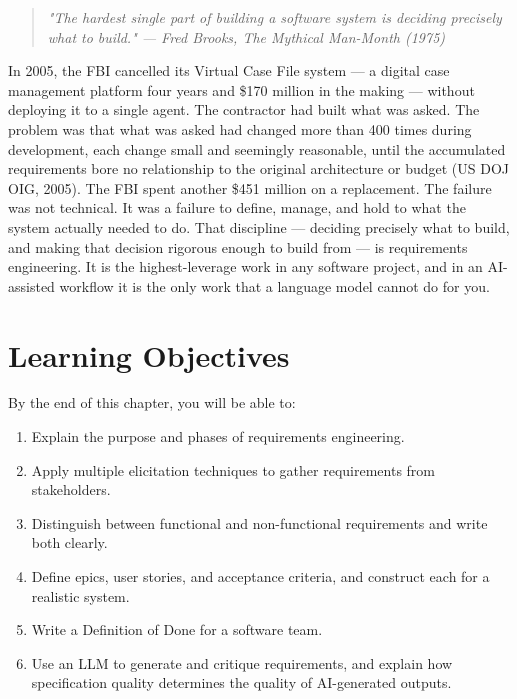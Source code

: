 \documentclass[11pt,a4paper]{book}
\begin{document}
\begin{quote}
\textit{\textit{"The hardest single part of building a software system is deciding precisely what to build."} --- Fred Brooks, \textit{The Mythical Man-Month} (1975)}
\end{quote}

\medskip

In 2005, the FBI cancelled its Virtual Case File system --- a digital case management platform four years and \$170 million in the making --- without deploying it to a single agent. The contractor had built what was asked. The problem was that what was asked had changed more than 400 times during development, each change small and seemingly reasonable, until the accumulated requirements bore no relationship to the original architecture or budget (US DOJ OIG, 2005). The FBI spent another \$451 million on a replacement. The failure was not technical. It was a failure to define, manage, and hold to what the system actually needed to do. That discipline --- deciding precisely what to build, and making that decision rigorous enough to build from --- is requirements engineering. It is the highest-leverage work in any software project, and in an AI-assisted workflow it is the only work that a language model cannot do for you.

\medskip

\section{Learning Objectives}

By the end of this chapter, you will be able to:

\begin{enumerate}
  \item Explain the purpose and phases of requirements engineering.
  \item Apply multiple elicitation techniques to gather requirements from stakeholders.
  \item Distinguish between functional and non-functional requirements and write both clearly.
  \item Define epics, user stories, and acceptance criteria, and construct each for a realistic system.
  \item Write a Definition of Done for a software team.
  \item Use an LLM to generate and critique requirements, and explain how specification quality determines the quality of AI-generated outputs.
\end{enumerate}
\end{document}

